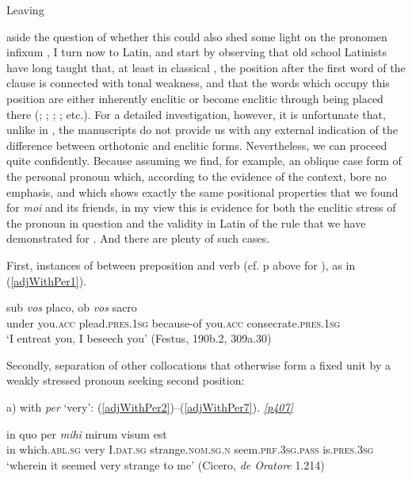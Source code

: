 \hypertarget{latinpron}{Leaving} aside the question of whether this could also shed some light on the  pronomen infixum \citep[327ff]{Zeuss1871}, I turn now to Latin, and start by observing that old school Latinists have long taught that, at least in classical , the position after the first word of the clause is connected with tonal weakness, and that the words which occupy this position are either inherently enclitic or become enclitic through being placed there (\citealp[818]{Reisig1839}; \citealp[43]{Madvig1839}; \citealp[49, 64]{SeyffertMueller1876}; \citealp[557]{StolzSchmalz1890}; etc.). For a detailed investigation, however, it is unfortunate that, unlike in , the manuscripts do not provide us with any external indication of the difference between orthotonic and enclitic forms. Nevertheless, we can proceed quite confidently. Because assuming we find, for example, an oblique case form of the personal pronoun which, according to the evidence of the context, bore no emphasis, and which shows exactly the same positional properties that we found for \emph{moi} and its friends, in my view this is evidence for both the enclitic stress of the pronoun in question and the validity in Latin of the rule that we have demonstrated for . And there are plenty of such cases.

First, instances of  between preposition and verb (cf. p\pageref{VPtmesis} above for ), as in (\ref{adjWithPer1}). 

\begin{exe}
\ex
\gll sub \emph{vos} placo, ob \emph{vos} sacro\\
under you.\textsc{acc} plead.\textsc{pres.1sg} because-of you.\textsc{acc} consecrate.\textsc{pres.1sg}\\
\trans `I entreat you, I beseech you' (Festus, 190b.2, 309a.30)
\label{adjWithPer1}
\end{exe}

Secondly, separation of other collocations that otherwise form a fixed unit by a weakly stressed pronoun seeking second position:

a)  with \emph{per} `very': (\ref{adjWithPer2})--(\ref{adjWithPer7}). \hyperlink{p407}{\emph{[p407]}}

\begin{exe}
\ex
\gll in quo per \emph{mihi} mirum visum est\\
in which.\textsc{abl.sg} very I.\textsc{dat.sg} strange.\textsc{nom.sg.n} seem.\textsc{prf.3sg.pass} is.\textsc{pres.3sg}\\
\trans `wherein it seemed very strange to me' (Cicero, \textit{de Oratore} 1.214)
\label{adjWithPer2}
\end{exe}

